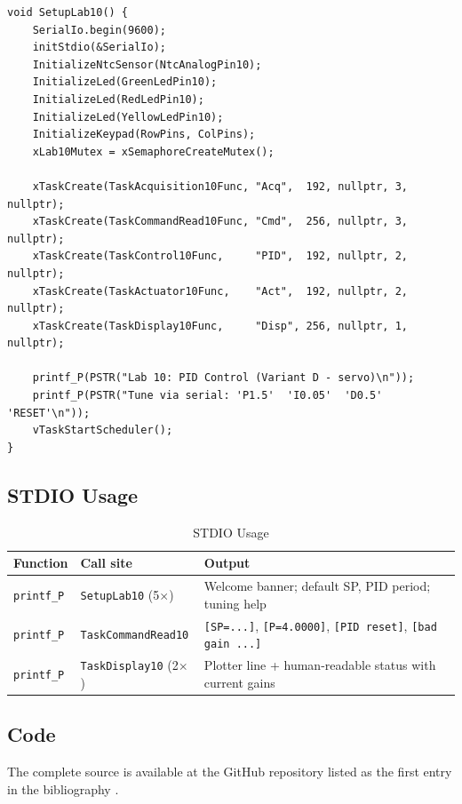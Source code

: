 \documentclass[12pt]{article}
\begin{document}
\begin{lstlisting}[caption={SetupLab10 --- task creation and welcome banner}]
void SetupLab10() {
    SerialIo.begin(9600);
    initStdio(&SerialIo);
    InitializeNtcSensor(NtcAnalogPin10);
    InitializeLed(GreenLedPin10);
    InitializeLed(RedLedPin10);
    InitializeLed(YellowLedPin10);
    InitializeKeypad(RowPins, ColPins);
    xLab10Mutex = xSemaphoreCreateMutex();

    xTaskCreate(TaskAcquisition10Func, "Acq",  192, nullptr, 3, nullptr);
    xTaskCreate(TaskCommandRead10Func, "Cmd",  256, nullptr, 3, nullptr);
    xTaskCreate(TaskControl10Func,     "PID",  192, nullptr, 2, nullptr);
    xTaskCreate(TaskActuator10Func,    "Act",  192, nullptr, 2, nullptr);
    xTaskCreate(TaskDisplay10Func,     "Disp", 256, nullptr, 1, nullptr);

    printf_P(PSTR("Lab 10: PID Control (Variant D - servo)\n"));
    printf_P(PSTR("Tune via serial: 'P1.5'  'I0.05'  'D0.5'  'RESET'\n"));
    vTaskStartScheduler();
}
\end{lstlisting}

\subsection{STDIO Usage}

\begin{table}[H]
\centering
\begin{tabular}{@{}lp{4cm}p{6.0cm}@{}}
\toprule
\textbf{Function} & \textbf{Call site} & \textbf{Output} \\
\midrule
\texttt{printf\_P} & \texttt{SetupLab10} (5$\times$) & Welcome banner; default SP, PID period; tuning help \\
\texttt{printf\_P} & \texttt{TaskCommandRead10}      & \texttt{[SP=...]}, \texttt{[P=4.0000]}, \texttt{[PID reset]}, \texttt{[bad gain ...]} \\
\texttt{printf\_P} & \texttt{TaskDisplay10} (2$\times$) & Plotter line + human-readable status with current gains \\
\bottomrule
\end{tabular}
\caption{STDIO Usage}
\label{tab:stdio}
\end{table}

\subsection{Code}

The complete source is available at the GitHub repository listed as the first entry in the bibliography \cite{code}.
\end{document}
